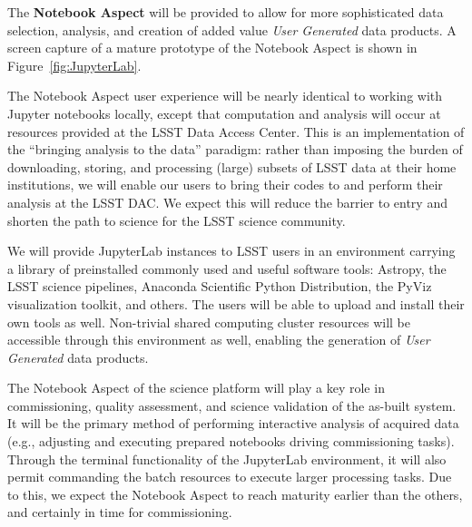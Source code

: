 The \textbf{Notebook Aspect}
will be provided to allow for more sophisticated data selection, analysis, and creation of added value \emph{User Generated} data products.
A screen capture of a mature prototype of the Notebook Aspect is shown in Figure~\ref{fig:JupyterLab}.

The Notebook Aspect user experience will be nearly identical to working with
Jupyter notebooks locally, except that computation and analysis will occur
at resources provided at the LSST Data Access Center.
This is an
implementation of the ``bringing analysis to the data'' paradigm: rather
than imposing the burden of downloading, storing, and processing (large)
subsets of LSST data at their home institutions, we will enable our users to
bring their codes to and perform their analysis at the LSST DAC.  We expect
this will reduce the barrier to entry and shorten the path to science for
the LSST science community.

We will provide JupyterLab instances to LSST users in an environment carrying a
library of preinstalled commonly used and useful software tools:
Astropy, the LSST science pipelines, Anaconda Scientific Python Distribution, the PyViz visualization toolkit, and others.
The users will be able to upload and install their own tools as well.
Non-trivial shared computing cluster resources will be accessible through this environment as well, enabling the generation of \emph{User Generated} data products.


The Notebook Aspect of the science platform will play a key role in commissioning,
quality assessment, and science validation of the as-built system.
It will be the primary method of performing interactive analysis of acquired data
(e.g., adjusting and executing prepared notebooks driving commissioning tasks).
Through the terminal functionality of the JupyterLab environment, it will also permit commanding the batch resources to execute larger processing tasks.
Due to this, we expect the
Notebook Aspect to reach maturity earlier than the others, and certainly in time for
commissioning.


